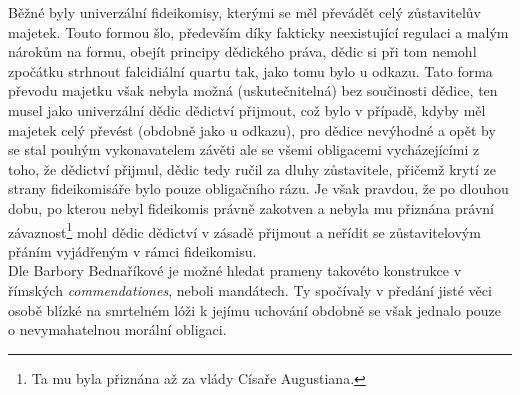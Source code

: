 \documentclass{article}
\begin{document}

Běžné byly univerzální fideikomisy, kterými se měl převádět celý zůstavitelův majetek. Touto formou šlo, především díky fakticky neexistující regulaci a malým nárokům na formu, obejít principy dědického práva, dědic si při tom nemohl zpočátku strhnout falcidiální quartu tak, jako tomu bylo u odkazu. Tato forma převodu majetku však nebyla možná (uskutečnitelná) bez součinosti dědice, ten musel jako univerzální dědic dědictví přijmout, což bylo v případě, kdyby měl majetek celý převést (obdobně jako u odkazu), pro dědice nevýhodné a opět by se stal pouhým vykonavatelem závěti ale se všemi obligacemi vycháze\-jícími z toho, že dědictví přijmul, dědic tedy ručil za dluhy zůstavitele, přičemž krytí ze strany fideikomisáře bylo pouze obligačního rázu. Je však pravdou, že po dlouhou dobu, po kterou nebyl fideikomis právně zakotven a nebyla mu přiznána právní závaznost\footnote{Ta mu byla přiznána až za vlády Císaře Augustiana.} mohl dědic dědictví v zásadě přijmout a neřídit se zůstavitelovým přáním vyjádřeným v rámci fideikomisu.\\


Dle Barbory Bednaříkové je možné hledat prameny takovéto konstrukce v římských \textit{commendationes}, neboli mandátech. Ty spočívaly v předání jisté věci osobě blízké na smrtelném lóži k jejímu uchování obdobně se však jednalo pouze o nevymahatelnou morální obligaci.\\

\end{document}
